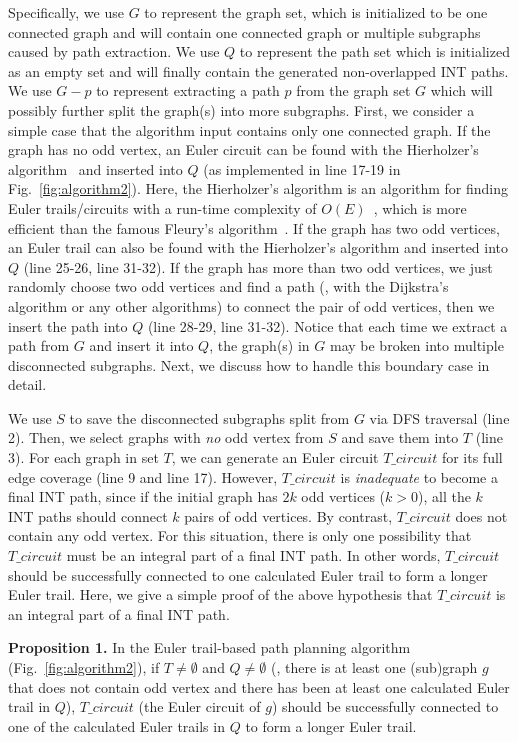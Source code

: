 Specifically, we use $G$ to represent the graph set, which is initialized to be one connected graph and will contain one connected graph or multiple subgraphs caused by path extraction. We use $Q$ to represent the path set which is initialized as an empty set and will finally contain the generated non-overlapped INT paths. We use $G-p$ to represent extracting a path $p$ from the graph set $G$ which will possibly further split the graph(s) into more subgraphs. First, we consider a simple case that the algorithm input contains only one connected graph. If the graph has no odd vertex, an Euler circuit can be found with the Hierholzer's algorithm~\cite{hierholzer1873moglichkeit} and inserted into $Q$ (as implemented in line 17-19 in Fig.~\ref{fig:algorithm2}). Here, the Hierholzer's algorithm is an algorithm for finding Euler trails/circuits with a run-time complexity of $O(E)$~\cite{fleischner1991x}, which is more efficient than the famous Fleury's algorithm~\cite{fleury1883deux}. If the graph has two odd vertices, an Euler trail can also be found with the Hierholzer's algorithm and inserted into $Q$ (line 25-26, line 31-32). If the graph has more than two odd vertices, we just randomly choose two odd vertices and find a path (\eg, with the Dijkstra's algorithm or any other algorithms) to connect the pair of odd vertices, then we insert the path into $Q$ (line 28-29, line 31-32). Notice that each time we extract a path from $G$ and insert it into $Q$, the graph(s) in $G$ may be broken into multiple disconnected subgraphs. Next, we discuss how to handle this boundary case in detail.

We use $S$ to save the disconnected subgraphs split from $G$ via DFS traversal (line 2). Then, we select graphs with \emph{no} odd vertex from $S$ and save them into $T$ (line 3). For each graph in set $T$, we can generate an Euler circuit $T\_circuit$ for its full edge coverage (line 9 and line 17). However, $T\_circuit$ is \emph{inadequate} to become a final INT path, since if the initial graph has $2k$ odd vertices ($k>0$), all the $k$ INT paths should connect $k$ pairs of odd vertices. By contrast, $T\_circuit$ does not contain any odd vertex. For this situation, there is only one possibility that $T\_circuit$ must be an integral part of a final INT path. In other words, $T\_circuit$ should be successfully connected to one calculated Euler trail to form a longer Euler trail. Here, we give a simple proof of the above hypothesis that $T\_circuit$ is an integral part of a final INT path.

\textbf{Proposition 1.}
In the Euler trail-based path planning algorithm (Fig.~\ref{fig:algorithm2}), if $T \neq \emptyset$ and $Q \neq \emptyset$ (\ie, there is at least one (sub)graph $g$ that does not contain odd vertex and there has been at least one calculated Euler trail in $Q$), $T\_circuit$ (the Euler circuit of $g$) should be successfully connected to one of the calculated Euler trails in $Q$ to form a longer Euler trail.

